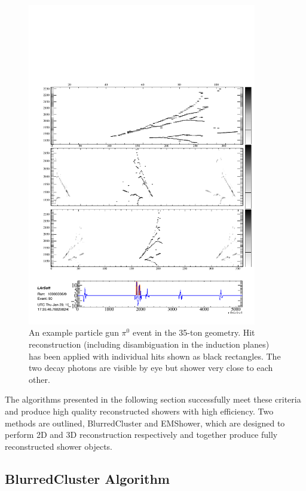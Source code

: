 \begin{figure}
  \centering
  \includegraphics[width=10cm]{EVDPi0Hits.pdf}
  \caption[An example particle gun $\pi^0$ event in the 35-ton geometry.]{An example particle gun $\pi^0$ event in the 35-ton geometry.  Hit reconstruction (including disambiguation in the induction planes) has been applied with individual hits shown as black rectangles.  The two decay photons are visible by eye but shower very close to each other.}
  \label{fig:pi0Showers}
\end{figure}

The algorithms presented in the following section successfully meet these criteria and produce high quality reconstructed showers with high efficiency.  Two methods are outlined, BlurredCluster and EMShower, which are designed to perform 2D and 3D reconstruction respectively and together produce fully reconstructed shower objects.

\subsection{BlurredCluster Algorithm}\label{sec:BlurredCluster}

